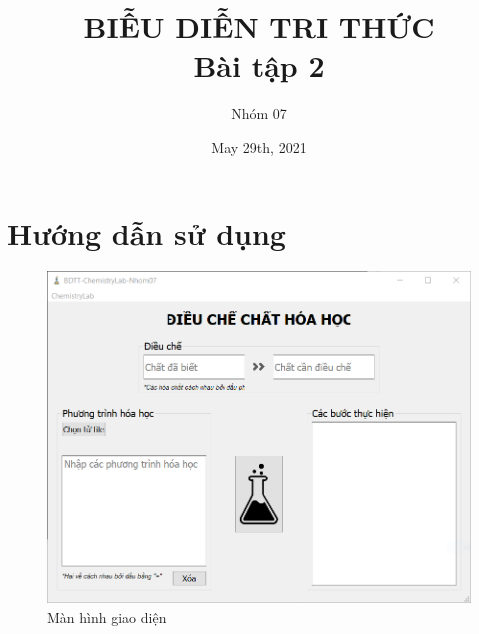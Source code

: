 \documentclass[a4paper]{article}
\title{BIỄU DIỄN TRI THỨC\\ Bài tập 2}
\author{Nhóm 07}
\date{May 29th, 2021}
\begin{document}
	\section*{Hướng dẫn sử dụng}
	\begin{figure}[h]
		\centering \includegraphics[width=.7\linewidth]{hdsd1}
		\caption{Màn hình giao diện}
		\label{screen}
	\end{figure}
\end{document}
